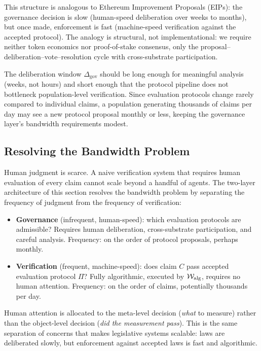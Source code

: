 This structure is analogous to Ethereum Improvement Proposals (EIPs):
the governance decision is slow (human-speed deliberation over weeks to
months), but once made, enforcement is fast (machine-speed verification
against the accepted protocol).  The analogy is structural, not
implementational: we require neither token economics nor
proof-of-stake consensus, only the proposal--deliberation--vote--resolution
cycle with cross-substrate participation.

\begin{remark}
The deliberation window $\Delta_{\mathrm{gov}}$ should be long enough
for meaningful analysis (weeks, not hours) and short enough that the
protocol pipeline does not bottleneck population-level verification.
Since evaluation protocols change rarely compared to individual
claims, a population generating thousands of claims per day may see a
new protocol proposal monthly or less, keeping the governance layer's
bandwidth requirements modest.
\end{remark}

\subsection{Resolving the Bandwidth Problem}
\label{sec:bandwidth}

Human judgment is scarce.  A naive verification system that requires
human evaluation of every claim cannot scale beyond a handful of agents.
The two-layer architecture of this section resolves the bandwidth
problem by separating the frequency of judgment from the frequency of
verification:

\begin{itemize}
    \item \textbf{Governance} (infrequent, human-speed): which evaluation
    protocols are admissible?  Requires human deliberation, cross-substrate
    participation, and careful analysis.  Frequency: on the order of
    protocol proposals, perhaps monthly.
    \item \textbf{Verification} (frequent, machine-speed): does claim
    $C$ pass accepted evaluation protocol $\Pi$?  Fully algorithmic,
    executed by $\mathcal{W}_{\mathrm{alg}}$, requires no human attention.
    Frequency: on the order of claims, potentially thousands per day.
\end{itemize}

Human attention is allocated to the meta-level decision (\emph{what} to
measure) rather than the object-level decision (\emph{did the
measurement pass}).  This is the same separation of concerns that makes
legislative systems scalable: laws are deliberated slowly, but
enforcement against accepted laws is fast and algorithmic.

